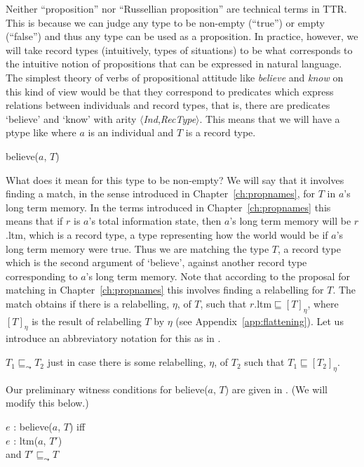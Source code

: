 Neither ``proposition'' nor ``Russellian proposition'' are technical
terms in TTR. This is because we can judge any type to be non-empty
(``true'') or empty (``false'') and thus any type can be used as a
proposition.  In practice, however, we will take record types
(intuitively, types of situations) to be what corresponds to the
intuitive notion of propositions that can be expressed in natural
language.  The simplest theory of verbs of propositional attitude like
\textit{believe} and \textit{know} on this kind of view would be that
they correspond to predicates which express relations between
individuals and record types, that is, there are predicates `believe'
and `know' with arity
$\langle$\textit{Ind},\textit{RecType}$\rangle$.  This means that we
will have a ptype like \nexteg{} where $a$ is an individual and $T$ is
a record type.
\begin{ex} 
believe($a$, $T$) 
\end{ex} 
What does it mean for this type to be non-empty?  We will say that it
involves finding a match, in the sense introduced in
Chapter~\ref{ch:propnames}, for $T$ in $a$'s long term memory. In the
terms introduced in Chapter~\ref{ch:propnames} this means that if $r$
is $a$'s total information state, then $a$'s long term memory will be
$r$.ltm, which is a record type, a type representing how the world
would be if $a$'s long term memory were true.  Thus we are matching
the type $T$, a record type which is the second argument of `believe',
against another record type corresponding to $a$'s long term memory.
Note that according to the proposal for matching in
Chapter~\ref{ch:propnames} this involves finding a relabelling for $T$.  The match obtains if there is
a relabelling, $\eta$, of $T$, such that
$r$.ltm$\sqsubseteq[T]_{\eta}$, where $[T]_{\eta}$ is the result of
relabelling $T$ by $\eta$ (see Appendix~\ref{app:flattening}). Let us introduce an
abbreviatory notation for this as in \nexteg{}.
\begin{ex} 
$T_1\sqsubseteq_{\leadsto}T_2$ just in case there is some relabelling,
$\eta$, of $T_2$ such that $T_1\sqsubseteq[T_2]_{\eta}$. 
\end{ex} 
  
Our preliminary witness conditions for believe($a$, $T$) are given in
\nexteg{}. (We will modify this below.)
\begin{ex} 
$e$ : believe($a$, $T$) iff\\
\hspace*{2em} $e$ : ltm($a$, $T'$) \\
\hspace*{2em} and $T'\sqsubseteq_{\leadsto}T$ 
\label{ex:believe-witcond-prelim}
\end{ex} 
   

